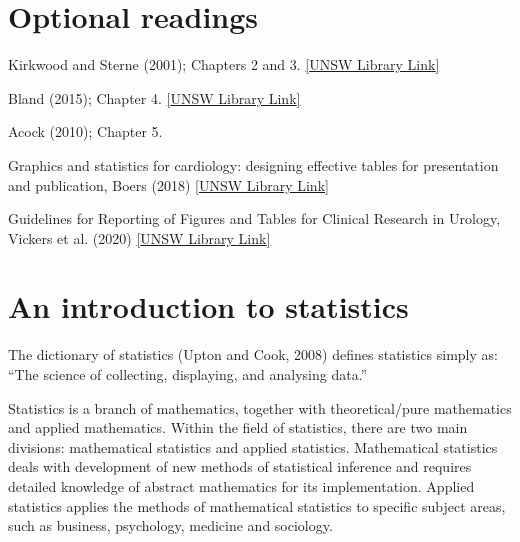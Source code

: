 \documentclass[
  a4paper,
]{memoir}
\begin{document}
\hypertarget{optional-readings}{%
\section*{Optional readings}\label{optional-readings}}


Kirkwood and Sterne (2001); Chapters 2 and 3.
\href{http://er1.library.unsw.edu.au/er/cgi-bin/eraccess.cgi?url=https://ebookcentral.proquest.com/lib/unsw/detail.action?docID=624728}{{[}UNSW
Library Link{]}}

Bland (2015); Chapter 4.
\href{http://er1.library.unsw.edu.au/er/cgi-bin/eraccess.cgi?url=https://ebookcentral.proquest.com/lib/unsw/detail.action?docID=5891730}{{[}UNSW
Library Link{]}}

Acock (2010); Chapter 5.

Graphics and statistics for cardiology: designing effective tables for
presentation and publication, Boers (2018)
\href{https://er1.library.unsw.edu.au/er/cgi-bin/eraccess.cgi?url=http://dx.doi.org/10.1136/heartjnl-2017-311581}{{[}UNSW
Library Link{]}}

Guidelines for Reporting of Figures and Tables for Clinical Research in
Urology, Vickers et al. (2020)
\href{https://er1.library.unsw.edu.au/er/cgi-bin/eraccess.cgi?url=http://dx.doi.org/10.1016/j.eururo.2020.04.048}{{[}UNSW
Library Link{]}}

\hypertarget{an-introduction-to-statistics}{%
\section{An introduction to
statistics}\label{an-introduction-to-statistics}}

The dictionary of statistics (Upton and Cook, 2008) defines statistics
simply as: ``The science of collecting, displaying, and analysing
data.''

Statistics is a branch of mathematics, together with theoretical/pure
mathematics and applied mathematics. Within the field of statistics,
there are two main divisions: mathematical statistics and applied
statistics. Mathematical statistics deals with development of new
methods of statistical inference and requires detailed knowledge of
abstract mathematics for its implementation. Applied statistics applies
the methods of mathematical statistics to specific subject areas, such
as business, psychology, medicine and sociology.
\end{document}
